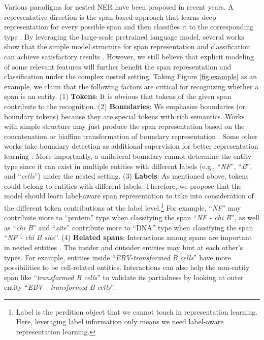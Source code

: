 \documentclass[11pt]{article}
\begin{document}
Various paradigms for nested NER have been proposed in recent years. A representative direction is the span-based approach that learns deep representation for every possible span and then classifies it to the corresponding type \cite{zheng2019boundary,mgner,wadden2019entity,bensc,wang2020pyramid,yu2020named}. 
By leveraging the large-scale pretrained language model, several works show that the simple model structure for span representation and classification can achieve satisfactory results \cite{dygie,zhong2021frustratingly}. However, we still believe that explicit modeling of some relevant features will further benefit the span representation and classification under the complex nested setting.
Taking Figure \ref{fig:example} as an example, we claim that the following factors are critical for recognizing whether a span is an entity.
(1) \textbf{Tokens}: 
It is obvious that tokens of the given span contribute to the recognition.
(2) \textbf{Boundaries}: 
We emphasize boundaries (or boundary tokens) because they are special tokens with rich semantics. Works with simple structure may just produce the span representation based on the concatenation or biaffine transformation of boundary representation \cite{yu2020named,fu2021nested}. Some other works take boundary detection as additional supervision for better representation learning \cite{zheng2019boundary,bensc}. More importantly, a unilateral boundary cannot determine the entity type since it can exist in multiple entities with different labels (e.g., ``\textit{NF}'', ``\textit{B}'', and ``\textit{cells}'') under the nested setting.
(3) \textbf{Labels}:
As mentioned above, tokens could belong to entities with different labels.
Therefore, we propose that the model should learn label-aware span representation to take into consideration of the different token contributions at the label level.\footnote{Label is the perdition object that we cannot touch in representation learning. Here, leveraging label information only means we need label-aware representation learning.}
For example, ``\textit{NF}'' may contribute more to ``protein'' type when classifying the span ``\textit{NF - chi B}'', as well as ``\textit{chi B}'' and ``\textit{site}'' contribute more to ``DNA'' type when classifying the span ``\textit{NF - chi B site}''.
(4) \textbf{Related spans}:
Interactions among spans are important in nested entities \cite{luo2020bipartite, wang2020pyramid, fu2021nested}.
The insider and outsider entities may hint at each other's types.
For example, entities inside ``\textit{EBV-transformed B cells}'' have more possibilities to be cell-related entities.
Interactions can also help the non-entity span like ``\textit{transformed B cells}'' to validate its partialness by looking at outer entity ``\textit{EBV - transformed B cells}''.
\end{document}
